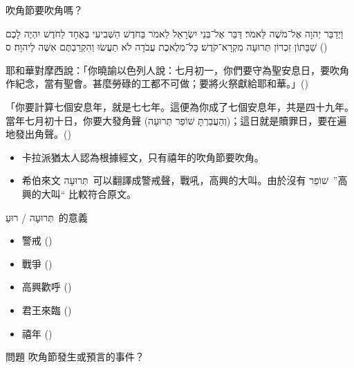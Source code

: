 \documentclass{beamer}
\makeatletter
\newcommand{\biblerefhebrew}[1]{\brm@bibleref{hebrew}{#1}}
\newcommand{\question}[1]{
  \begin{frame}{問題}
    \centering
    \vspace*{1cm}
    \huge #1？\par
    \vfill
  \end{frame}
}
\newcommand{\parvspace}{\par\vspace{0.5em}}
\makeatother
\begin{document}
\begin{frame}{吹角節要吹角嗎？}
  \begin{hebrew}וַיְדַבֵּר יְהוָה אֶל־מֹשֶׁה לֵּאמֹר׃ דַּבֵּר אֶל־בְּנֵי יִשְׂרָאֵל לֵאמֹר בַּחֹדֶשׁ הַשְּׁבִיעִי בְּאֶחָד לַחֹדֶשׁ יִהְיֶה לָכֶם שַׁבָּתוֹן זִכְרוֹן \alert{תְּרוּעָה} מִקְרָא־קֹדֶשׁ׃ כָּל־מְלֶאכֶת עֲבֹדָה לֹא תַעֲשׂוּ וְהִקְרַבְתֶּם אִשֶּׁה לַיהוָה׃ ס (\biblerefhebrew{Lv 23:23-25})
  \end{hebrew}\parvspace
  耶和華對摩西說：「你曉諭以色列人說：\alert{七月初一}，你們要守為\alert{聖安息日}，要吹角作紀念，當有聖會。甚麼勞碌的工都不可做；要將火祭獻給耶和華。」()\parvspace
  「你要計算七個安息年，就是七七年。這便為你成了七個安息年，共是四十九年。 當年七月初十日，你要\alert{大發角聲 (\texthebrew{וְהַעֲבַרְתָּ שׁוֹפַר תְּרוּעָה})}；這日就是贖罪日，要在遍地發出角聲。()\parvspace
  \begin{itemize}
    \item 卡拉派猶太人認為根據經文，只有禧年的吹角節要吹角。\parencite{Karaism}
    \item 希伯來文 \texthebrew{תְּרוּעָה}\ 可以翻譯成警戒聲，戰吼，高興的大叫。由於沒有 \texthebrew{שׁוֹפַר}\ ”高興的大叫“ 比較符合原文。
  \end{itemize}
\end{frame}

\begin{frame}{\texthebrew{תְּרוּעָה / רוּעַ}\ 的意義}
  \begin{itemize}
    \item 警戒 ()
    \item 戰爭 ()
    \item 高興歡呼 ()
    \item 君王來臨 ()
    \item 禧年 ()
  \end{itemize}
\end{frame}

\question{吹角節發生或預言的事件}
\end{document}
